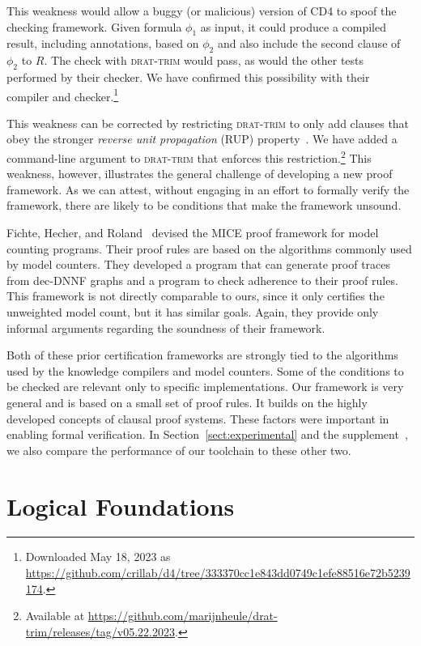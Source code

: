 \documentclass[letterpaper,USenglish,cleveref, autoref, thm-restate]{lipics-v2021}
\newcommand{\progname}[1]{\textsc{#1}}
\newcommand{\cdfour}{\progname{CD4}}
\newcommand{\dtrim}{\progname{drat-trim}}
\begin{document}
This weakness would allow a buggy (or malicious) version of \cdfour{}
to spoof the checking framework.  Given formula $\phi_1$ as input, it
could produce a compiled result, including annotations, based on $\phi_2$ and also include the second clause of $\phi_2$ to $R$.
The check with \dtrim{} would pass, as would the other tests performed
by their checker.  We have confirmed this possibility with
their compiler and checker.\footnote{Downloaded May 18, 2023 as\\
\url{https://github.com/crillab/d4/tree/333370cc1e843dd0749c1efe88516e72b5239174}.}


This weakness can be corrected by restricting \dtrim{} to only add
clauses that obey the stronger \emph{reverse unit propagation} (RUP) property~\cite{goldberg,vangelder08_verifying_rup_proofs}.  We have added a
command-line argument to \dtrim{} that enforces this
restriction.\footnote{Available at
\url{https://github.com/marijnheule/drat-trim/releases/tag/v05.22.2023}.}  This weakness, however, illustrates the general challenge of
developing a new proof framework.
As we can attest,
without engaging in an effort to formally verify the framework, there are likely to be
conditions that make the framework unsound.

Fichte, Hecher, and Roland~\cite{fichte:sat:2022} devised the MICE
proof framework for model counting programs.  Their proof rules are
based on the algorithms commonly used by model counters.  They
developed a program that can generate proof traces from dec-DNNF
graphs and a program to check adherence to their proof rules.  This
framework is not directly comparable to ours, since it only certifies
the unweighted model count, but it has similar goals.
Again, they provide only  informal arguments
regarding the soundness of their framework.

Both of these prior certification frameworks are strongly tied to the
algorithms used by the knowledge compilers and model counters.  Some
of the conditions to be checked are relevant only to specific
implementations.    Our framework is very general and is based on a small set
of proof rules.  It builds on the highly developed
concepts of clausal proof systems.  These factors were important in enabling formal verification.
In Section~\ref{sect:experimental} and the supplement~\cite{bryant:sat:2023:supplement},
we also compare the performance of our toolchain to these other two.


\section{Logical Foundations}
\label{section:logical:foundations}
\end{document}
